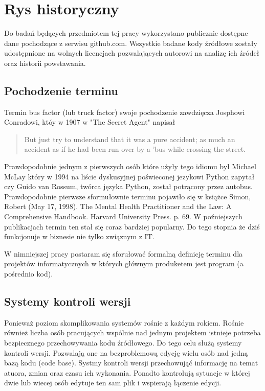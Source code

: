\documentclass[a4paper,11pt,twoside]{report}
\theoremstyle{definition}
\begin{document}
\chapter{Rys historyczny}


Do badań będących przedmiotem tej pracy wykorzystano publicznie dostępne 
dane 
pochodzące z serwisu github.com. Wszystkie badane kody źródłowe zostały 
udostępnione na wolnych
licencjach pozwalających autorowi na analizę ich źródeł oraz historii 
powstawania.


\section{Pochodzenie terminu}

Termin bus factor (lub truck factor) swoje pochodzenie zawdzięcza Josphowi 
Conradowi, któy w 1907 w "The Secret Agent" napisał

\begin{quote}
But just try to understand that it was a pure accident; as much an accident as 
if he had been run over by a 'bus while crossing the street.
\end{quote}

Prawdopodobnie jednym z pierwszych osób które użyły tego idiomu był  
Michael McLay który w 1994 na liście dyskusyjnej poświeconej jezykowi Python 
zapytał czy  Guido van Rossum, twórca języka Python, został potrącony 
przez autobus.
Prawdopodobnie pierwsze sformułownie terminu pojawiło się w książce Simon, 
Robert (May 17, 1998). The Mental Health Practitioner and the Law: A 
Comprehensive Handbook. Harvard University Press. p. 69. W poźniejszych 
publikacjach termin ten stał się coraz bardziej popularny. Do tego stopnia 
że dziś funkcjonuje w biznesie nie tylko związnym z IT.

W nimniejszej pracy postaram się sforułować formalną definicję terminu dla 
projektów informatycznych w których głównym produketem jest program (a 
pośrednio kod). 

\section{Systemy kontroli wersji}

Ponieważ poziom skomplikowania systemów rośnie z każdym rokiem. Rośnie 
również liczba osób pracujących wspólnie nad jednym projektem istnieje 
potrzeba bezpiecznego przechowywania kodu źródłowego. Do tego celu służą 
systemy kontroli wersji. Pozwalają one na bezproblemową edycję wielu osób 
nad jedną bazą kodu (code base). Systmy kontroli wersji przechowująć 
informację na temat atuora, zmian oraz czasu ich wykonania. Ponadto 
kontrolują sytuacje w której dwie lub wiecej osób edytuje ten sam plik i 
wspierają łączenie edycji. 
\end{document}
